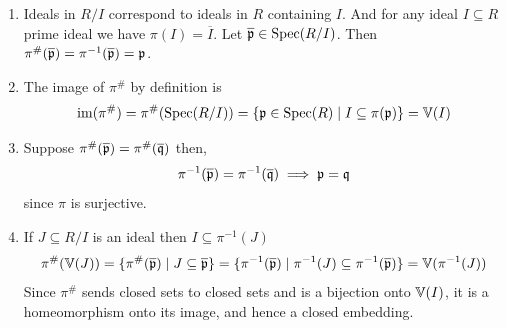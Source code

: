 \documentclass[Notebook.tex]{subfiles}
\begin{document}
\begin{solution}
    \bbni
    \begin{enumerate}[label=(\alph*),ref=\theenumi\alph*]
        \item Ideals in $R/I$ correspond to ideals in $R$ containing $I$. And for any ideal $I \subseteq R$ prime ideal we have $\pi(I) = \overline{I}$. Let $\overline{\operatorname{\mathfrak{p}}} \in \operatorname{Spec}(R/I)$. Then $\pi^{\#}(\overline{\operatorname{\mathfrak{p}}}) = \pi^{-1}(\overline{\operatorname{\mathfrak{p}}}) = \operatorname{\mathfrak{p}}$. 
        \item The image of $\pi^{\#}$ by definition is
        \[\operatorname{im}(\pi^{\#}) = \pi^{\#}(\operatorname{Spec}(R/I)) = \{\operatorname{\mathfrak{p}} \in \operatorname{Spec}(R) \mid I \subseteq \pi(\operatorname{\mathfrak{p}})\} = \mathbb V(I)\]
        \item Suppose $\pi^{\#}(\overline{\operatorname{\mathfrak{p}}}) = \pi^{\#}(\overline{\operatorname{\mathfrak{q}}})$ then, 
        \[\pi^{-1}(\overline{\operatorname{\mathfrak{p}}}) = \pi^{-1}(\overline{\operatorname{\mathfrak{q}}}) \implies \operatorname{\mathfrak{p}} = \operatorname{\mathfrak{q}}\]
        since $\pi$ is surjective. 
        \item If $J \subseteq R/I$ is an ideal then $I \subseteq \pi^{-1}(J)$  
        \[\pi^{\#}(\mathbb V(J)) = \{\pi^{\#}(\overline{\operatorname{\mathfrak{p}}}) \mid J \subseteq \overline{\operatorname{\mathfrak{p}}}\} = \{\pi^{-1}(\overline{\operatorname{\mathfrak{p}}})\mid \pi^{-1}(J) \subseteq \pi^{-1}(\overline{\operatorname{\mathfrak{p}}})\} = \mathbb V(\pi^{-1}(J))\]
        Since $\pi^{\#}$ sends closed sets to closed sets and is a bijection onto $\mathbb V(I)$, it is a homeomorphism onto its image, and hence a closed embedding. 
    \end{enumerate}
\end{solution}
\end{document}
